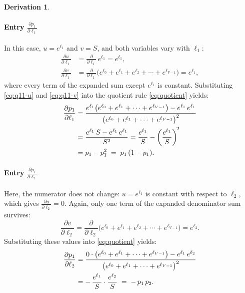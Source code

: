 \documentclass[letterpaper, 10 pt, conference]{ieeeconf}
\newcommand{\pdv}[2]{\frac{\partial #1}{\partial #2}}
\theoremstyle{definition}
\newtheorem*{derivation}{Derivation}
\begin{document}
\begin{derivation}
  \paragraph{Entry $\pdv{p_1}{\ell_1}$}
  In this case, $u = e^{\ell_1}$ and $v = S$, and both variables vary with $\ell_1$:
  \begin{align}
    \pdv{u}{\ell_1} & = \pdv{}{\ell_1}\,e^{\ell_1} = e^{\ell_1},
    \label{eq:q11-u}                                                \\
    \pdv{v}{\ell_1} & = \pdv{}{\ell_1}\bigl(e^{\ell_0} + e^{\ell_1}
    + e^{\ell_2} + \cdots + e^{\ell_{V-1}}\bigr) = e^{\ell_1},
    \label{eq:q11-v}
  \end{align}
  where every term of the expanded sum except $e^{\ell_1}$ is constant. Substituting \eqref{eq:q11-u} and \eqref{eq:q11-v} into the quotient rule \eqref{eq:quotient} yields:
  \begin{align}
    \pdv{p_1}{\ell_1}
     & = \frac{e^{\ell_1}\bigl(e^{\ell_0} + e^{\ell_1} + \cdots
      + e^{\ell_{V-1}}\bigr)
      - e^{\ell_1}\,e^{\ell_1}}
    {\bigl(e^{\ell_0} + e^{\ell_1} + \cdots + e^{\ell_{V-1}}\bigr)^{2}}
    \notag                                                      \\
     & = \frac{e^{\ell_1}\,S - e^{\ell_1}\,e^{\ell_1}}{S^{2}}
    = \frac{e^{\ell_1}}{S}
    - \left(\frac{e^{\ell_1}}{S}\right)^{\!2} \notag            \\
     & = p_1 - p_1^{2} \;=\; p_1\,(1 - p_1).
    \label{eq:q11}
  \end{align}

  \paragraph{Entry $\pdv{p_1}{\ell_2}$}
  Here, the numerator does not change: $u = e^{\ell_1}$ is constant with respect to $\ell_2$, which gives $\pdv{u}{\ell_2} = 0$. Again, only one term of the expanded denominator sum survives:
  \begin{equation}
    \pdv{v}{\ell_2} = \pdv{}{\ell_2}\bigl(e^{\ell_0} + e^{\ell_1}
    + e^{\ell_2} + \cdots + e^{\ell_{V-1}}\bigr) = e^{\ell_2}.
    \label{eq:q12-v}
  \end{equation}
  Substituting these values into \eqref{eq:quotient} yields:
  \begin{align}
    \pdv{p_1}{\ell_2}
     & = \frac{0 \cdot \bigl(e^{\ell_0} + e^{\ell_1} + \cdots
      + e^{\ell_{V-1}}\bigr)
      - e^{\ell_1}\,e^{\ell_2}}
    {\bigl(e^{\ell_0} + e^{\ell_1} + \cdots + e^{\ell_{V-1}}\bigr)^{2}}
    \notag                                                    \\
     & = -\,\frac{e^{\ell_1}}{S}\cdot\frac{e^{\ell_2}}{S}
    \;=\; -\,p_1\,p_2.
    \label{eq:q12}
  \end{align}


\end{derivation}
\end{document}

